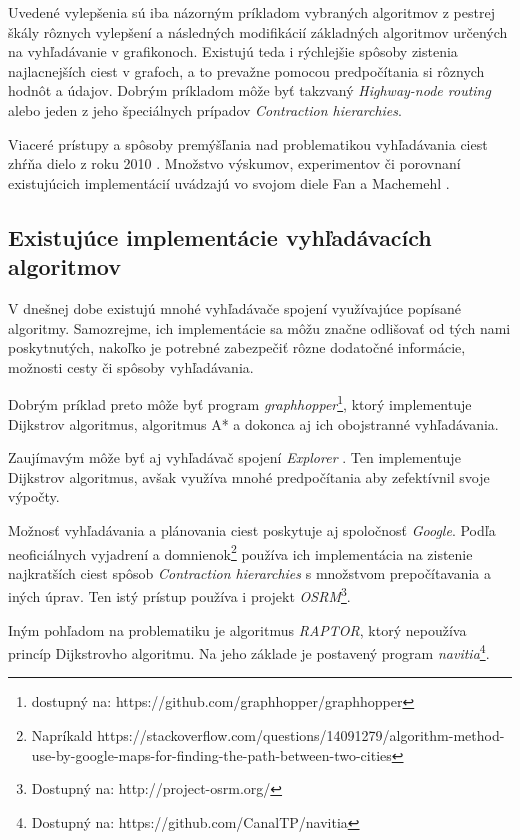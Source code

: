 Uvedené vylepšenia sú iba názorným príkladom vybraných algoritmov z pestrej škály rôznych vylepšení a následných modifikácií základných algoritmov určených na vyhľadávanie v grafikonoch. Existujú teda i rýchlejšie spôsoby zistenia najlacnejších ciest v grafoch, a to prevažne pomocou predpočítania si rôznych hodnôt a údajov. Dobrým príkladom môže byť takzvaný \textit{Highway-node routing}\cite{schultes2007dynamic} alebo jeden z jeho špeciálnych prípadov \textendash \textit{Contraction hierarchies}\cite{geisberger2008contraction}.\newline

Viaceré prístupy a spôsoby premýšľania nad problematikou vyhľadávania ciest zhŕňa dielo z roku 2010 \cite{bast2010fast}. Množstvo výskumov, experimentov či porovnaní existujúcich implementácií uvádzajú vo svojom diele Fan a Machemehl \cite{fan2004optimal}.


\subsection{Existujúce implementácie vyhľadávacích algoritmov}

V dnešnej dobe existujú mnohé vyhľadávače spojení využívajúce popísané algoritmy. Samozrejme, ich implementácie sa môžu značne odlišovať od tých nami poskytnutých, nakoľko je potrebné zabezpečiť rôzne dodatočné informácie, možnosti cesty či spôsoby vyhľadávania.\newline

Dobrým príklad preto môže byť program \textit{graphhopper}\footnote{dostupný na: https://github.com/graphhopper/graphhopper}, ktorý implementuje Dijkstrov algoritmus, algoritmus A* a dokonca aj ich obojstranné vyhľadávania.\newline

Zaujímavým môže byť aj vyhľadávač spojení \textit{Explorer} \cite{watkins2010explore}. Ten implementuje Dijkstrov algoritmus, avšak využíva mnohé predpočítania aby zefektívnil svoje výpočty.\newline

Možnosť vyhľadávania a plánovania ciest poskytuje aj spoločnosť \textit{Google}. Podľa neoficiálnych vyjadrení a domnienok\footnote{Napríkald https://stackoverflow.com/questions/14091279/algorithm-method-use-by-google-maps-for-finding-the-path-between-two-cities} používa ich implementácia na zistenie najkratších ciest spôsob \textit{Contraction hierarchies} s množstvom prepočítavania a iných úprav. Ten istý prístup používa i projekt \textit{OSRM}\footnote{Dostupný na: http://project-osrm.org/}.\newline

Iným pohľadom na problematiku je algoritmus \textit{RAPTOR}\cite{delling2014round}, ktorý nepoužíva princíp Dijkstrovho algoritmu. Na jeho základe je postavený program \textit{navitia}\footnote{Dostupný na: https://github.com/CanalTP/navitia}.\newline
